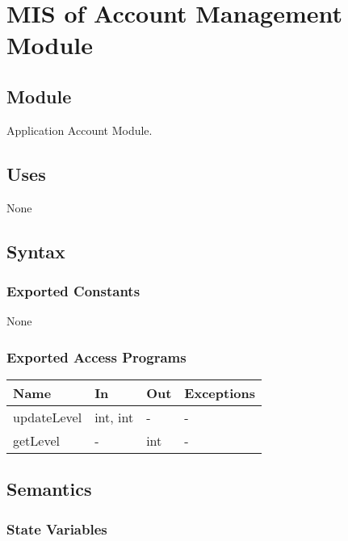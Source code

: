 \documentclass[12pt, titlepage]{article}
\begin{document}

\newpage


\section{MIS of Account Management Module} \label{Module}

\subsection{Module}

Application Account Module.

\subsection{Uses}

None

\subsection{Syntax}

\subsubsection{Exported Constants}

None

\subsubsection{Exported Access Programs}

\begin{center}
\begin{tabular}{p{4cm} p{4cm} p{2cm} p{2cm}}
\hline
\textbf{Name} & \textbf{In} & \textbf{Out} & \textbf{Exceptions} \\
\hline
updateLevel & int, int & - & - \\
getLevel & - & int & - \\
\hline
\end{tabular}
\end{center}

\subsection{Semantics}

\subsubsection{State Variables}
\end{document}
